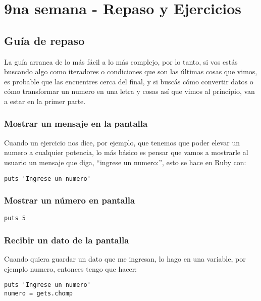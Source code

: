 \chapter{9na semana - Repaso y Ejercicios}
\section{Guía de repaso}

La guía arranca de lo más fácil a lo más complejo, por lo tanto, si vos estás buscando algo como iteradores o condiciones que son las últimas cosas que vimos, es probable que las encuentres cerca del final, y si buscás cómo convertir datos o cómo transformar un numero en una letra y cosas así que vimos al principio, van a estar en la primer parte.

\subsection{Mostrar un mensaje en la pantalla}
Cuando un ejercicio nos dice, por ejemplo, que tenemos que poder elevar un numero a cualquier potencia, lo más básico es pensar que vamos a mostrarle al usuario un mensaje que diga, “ingrese un numero:”, esto se hace en Ruby con:
\begin{lstlisting}
puts 'Ingrese un numero'
\end{lstlisting}

\subsection{Mostrar un número en pantalla}
\begin{lstlisting}
puts 5
\end{lstlisting}

\subsection{Recibir un dato de la pantalla}
Cuando quiera guardar un dato que me ingresan, lo hago en una variable, por ejemplo numero, entonces tengo que hacer:
\begin{lstlisting}
puts 'Ingrese un numero'
numero = gets.chomp
\end{lstlisting}

